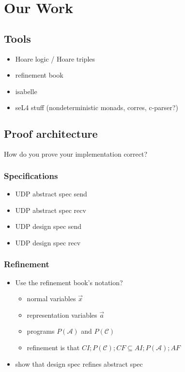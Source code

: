 \documentclass[twoside]{memoir}
\begin{document}
\chapter{Our Work}

\section{Tools}

\begin{itemize}
    \item Hoare logic / Hoare triples
    \item refinement book
    \item isabelle
    \item seL4 stuff (nondeterministic monads, corres, c-parser?)
\end{itemize}

\section{Proof architecture}
How do you prove your implementation correct?

\subsection{Specifications}
\begin{itemize}
    \item UDP abstract spec send
    \item UDP abstract spec recv
    \item UDP design spec send
    \item UDP design spec recv
\end{itemize}

\subsection{Refinement}
\begin{itemize}
    \item Use the refinement book's notation?
        \begin{itemize}
            \item normal variables $\vec{x}$ 
            \item representation variables $\vec{a}$ 
            \item programs $P(\mathcal{A})$ and $P(\mathcal{C})$
            \item refinement is that
                 $CI; P(\mathcal{C}); CF \subseteq AI; P(\mathcal{A}); AF$
                 
        \end{itemize}
    \item show that design spec refines abstract spec
\end{itemize}
\end{document}
